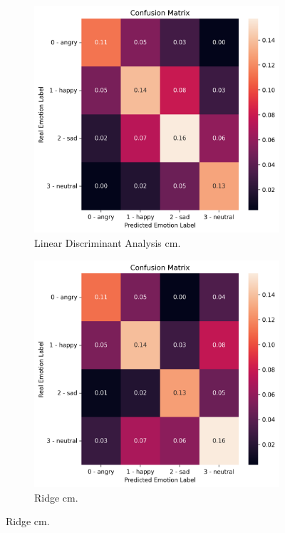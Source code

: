 \begin{figure}[H]
	\begin{subfigure}{.5\textwidth}
		\centering
		\includegraphics[width=.9\linewidth]{figs/appendix/feature_selection/LDACM.png}
		\caption{Linear Discriminant Analysis \ac{cm}.}
	\end{subfigure}%
	\begin{subfigure}{.5\textwidth}
		\centering
		\includegraphics[width=.9\linewidth]{figs/appendix/feature_selection/RidgeCM.png}
		\caption{Ridge \ac{cm}.}
	\end{subfigure}

\end{figure}
